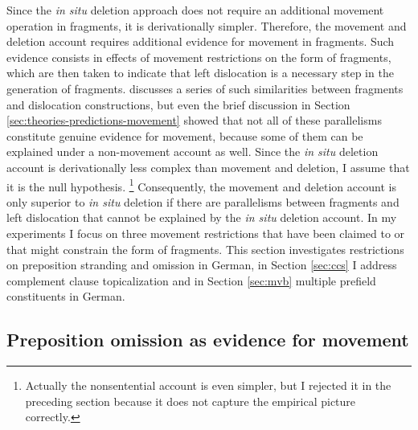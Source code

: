 Since the \textit{in situ} deletion approach does not require an additional movement operation in fragments, it is derivationally simpler. Therefore, the movement and deletion account requires additional evidence for movement in fragments. Such evidence consists in effects of movement restrictions on the form of fragments, which are then taken to indicate that left dislocation is a necessary step in the generation of fragments. \citet{merchant2004} discusses a series of such similarities between fragments and dislocation constructions, but even the brief discussion in Section \ref{sec:theories-predictions-movement} showed that not all of these parallelisms constitute genuine evidence for movement, because some of them can be explained under a non-movement account as well. Since the \textit{in situ} deletion account is derivationally less complex than movement and deletion, I assume that it is the null hypothesis.%
%
\footnote{Actually the nonsentential account is even simpler, but I rejected it in the preceding section because it does not capture the empirical picture correctly.}\afterfn%
%
Consequently, the movement and deletion account is only superior to \textit{in situ} deletion if there are parallelisms between fragments and left dislocation that cannot be explained by the \textit{in situ} deletion account. In my experiments I focus on three movement restrictions that have been claimed to or that might constrain the form of fragments. This section investigates restrictions on preposition stranding and omission in German, in Section \ref{sec:ccs} I address complement clause topicalization and in Section \ref{sec:mvb} multiple prefield constituents in German.

\subsection{Preposition omission as evidence for movement}\label{sec:pstranding-background}

